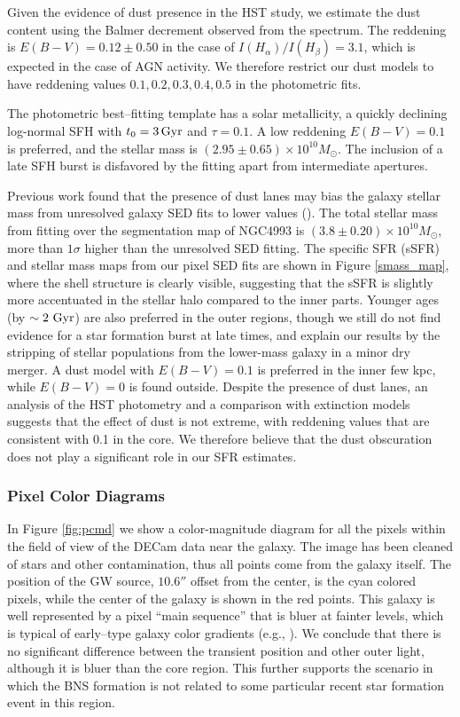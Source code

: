 Given the evidence of dust presence in the HST study, we estimate the dust content using the Balmer decrement \citep{berman} observed from the spectrum. The reddening is $E(B-V)=0.12\pm 0.50$ in the case of $I(H_\alpha)/I(H_\beta)= 3.1$, which is expected in the case of AGN activity. We therefore restrict our dust models to have reddening values $0.1,0.2,0.3,0.4,0.5$ in the photometric fits.

The photometric best--fitting template has a solar metallicity, a quickly declining log-normal SFH with $t_0=3 \,{\rm Gyr}$ and  $\tau=0.1$. A low reddening $E(B-V) =0.1$ is preferred, and the stellar mass is $(2.95\pm 0.65)\times 10^{10}M_\odot$. The inclusion of a late SFH burst is disfavored by the fitting apart from intermediate apertures. 

Previous work found that the presence of dust lanes may bias the galaxy stellar mass from unresolved galaxy SED fits to lower values (\citealt{sorba}). The total stellar mass from fitting over the \sextractor segmentation map of NGC4993 is $(3.8\pm 0.20)\times 10^{10} M_\odot$, more than $1\sigma$ higher than the unresolved SED fitting. The specific SFR (sSFR) and stellar mass maps from our pixel SED fits are shown in Figure \ref{smass_map}, where the shell structure is clearly visible, suggesting that the sSFR is slightly more accentuated in the stellar halo compared to the inner parts. Younger ages (by $\sim 2~{\rm Gyr}$) are also preferred in the outer regions, though we still do not find evidence for a star formation burst at late times, and explain our results by the stripping of stellar populations from the lower-mass galaxy in a minor dry merger. A dust model with $E(B-V)=0.1$ is preferred in the inner few kpc, while $E(B-V)=0$ is found outside. Despite the presence of dust lanes, an analysis of the HST photometry and a comparison with extinction models suggests that the effect of dust is not extreme, with reddening values that are consistent with 0.1 in the core. We therefore believe that the dust obscuration does not play a significant role in our SFR estimates.


\subsubsection{Pixel Color Diagrams}
In Figure \ref{fig:pcmd} we show a color-magnitude diagram for all the pixels within the field of view of the DECam data near the galaxy. The image has been cleaned of stars and other contamination, thus all points come from the galaxy itself. The position of the GW source, $10.6''$ offset from the center, is the cyan colored pixels, while the center of the galaxy is shown in the red points. This galaxy is well represented by a pixel ``main sequence'' that is bluer at fainter levels, which is typical of early--type galaxy color gradients (e.g., \citealt{lanyon-foster}). We conclude that there is no significant difference between the transient position and other outer light, although it is bluer than the core region. This further supports the scenario in which the BNS formation is not related to some particular recent star formation event in this region.


